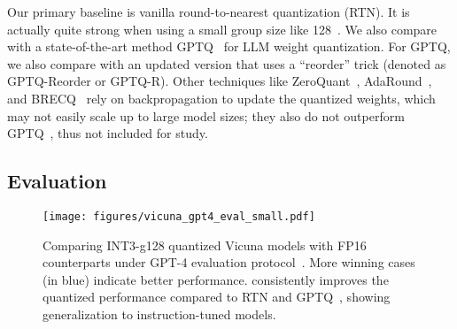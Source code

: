  Our primary baseline is vanilla round-to-nearest quantization (RTN). It is actually quite strong when using a small group size like 128~\cite{frantar2022gptq, dettmers2022case}. We also compare with a state-of-the-art method GPTQ~\cite{frantar2022gptq} for LLM weight quantization. For GPTQ, we also compare with an updated version that uses a ``reorder'' trick (denoted as GPTQ-Reorder or GPTQ-R). Other techniques like ZeroQuant~\cite{zeroquant}, AdaRound~\cite{nagel2020up}, and BRECQ~\cite{li2021brecq} rely on backpropagation to update the quantized weights, which may not easily scale up to large model sizes; they also do not outperform GPTQ~\cite{frantar2022gptq}, thus not included for study. 

\subsection{Evaluation}

\begin{figure}%
    \centering
     \texttt{[image: figures/vicuna\_gpt4\_eval\_small.pdf]}
    \caption{Comparing INT3-g128 quantized Vicuna models with FP16 counterparts under GPT-4 evaluation protocol~\cite{vicuna2023}. More winning cases (in 
    \textcolor{winblue}{blue}) indicate better performance. \methodshort consistently improves the quantized performance compared to RTN and GPTQ~\cite{frantar2022gptq}, showing generalization to instruction-tuned models.
    } 
    \label{fig:vicuna_gpt4_eval}
\end{figure}
    

